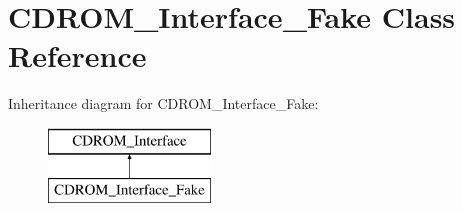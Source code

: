 \hypertarget{classCDROM__Interface__Fake}{\section{C\-D\-R\-O\-M\-\_\-\-Interface\-\_\-\-Fake Class Reference}
\label{classCDROM__Interface__Fake}
}
Inheritance diagram for C\-D\-R\-O\-M\-\_\-\-Interface\-\_\-\-Fake\-:\begin{figure}[H]
\begin{center}
\leavevmode
\includegraphics[height=2.000000cm]{classCDROM__Interface__Fake}
\end{center}
\end{figure}

